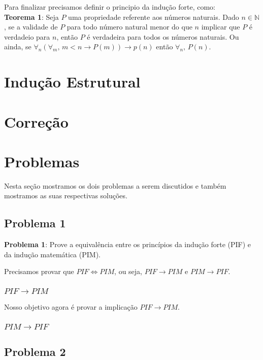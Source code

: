 \documentclass[a4paper, 10pt]{article}
\begin{document}
Para finalizar precisamos definir o principio da indução forte, como:\\
\textbf{Teorema 1}: Seja $P$ uma propriedade referente aos números naturais. Dado $n \in \mathbb{N}$, se a validade de $P$ para todo número natural menor do que $n$ implicar  que $P$ é verdadeio para $n$, então $P$ é verdadeira para todos os números naturais. Ou ainda, se $\forall_n ( \forall_m ,\, m < n \rightarrow P(m)) \rightarrow p(n)$ então $\forall_n ,\, P(n)$.


\section{Indução Estrutural}

\section{Correção}

\section{Problemas}

Nesta seção mostramos os dois problemas a serem discutidos e também mostramos as suas respectivas soluções.

\subsection{Problema 1}

\textbf{Problema 1}: Prove a equivalência entre os princípios da indução forte (PIF) e da indução matemática (PIM)\cite{Apostila}.

Precisamos provar que $PIF \Leftrightarrow PIM$, ou seja, $PIF \rightarrow PIM$ e $PIM \rightarrow PIF$.

\subsubsection*{$PIF \rightarrow PIM$}
Nosso objetivo agora é provar a implicação $PIF \rightarrow PIM$.


\subsubsection*{$PIM \rightarrow PIF$}


\subsection{Problema 2}
\end{document}
